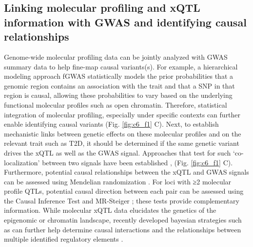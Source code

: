 \subsection{Linking molecular profiling and xQTL information with GWAS and identifying causal relationships}                
Genome-wide molecular profiling data can be jointly analyzed with GWAS summary data to help fine-map causal variants(s). For example, a hierarchical modeling approach fGWAS \cite{pickrellJointAnalysisFunctional2014} statistically models the prior probabilities that a genomic region contains an association with the trait and that  a SNP in that region is causal, allowing these probabilities to vary based on the underlying functional molecular profiles such as open chromatin. Therefore, statistical integration of molecular profiling, especially under specific contexts can further enable identifying causal variants (Fig. \ref{fig:c6_f1} C). Next, to establish mechanistic links between genetic effects on these molecular profiles and on the relevant trait such as T2D, it should be determined if the same genetic variant drives the xQTL as well as the GWAS signal. Approaches that test for such ‘co-localization’ between two signals have been established \cite{giambartolomeiBayesianTestColocalisation2014, nicaCandidateCausalRegulatory2010, hormozdiariColocalizationGWASEQTL2016}, (Fig. \ref{fig:c6_f1} C). Furthermore, potential causal relationships between the xQTL and GWAS signals can be assessed using Mendelian randomization \cite{hormozdiariColocalizationGWASEQTL2016}. For loci with ≥2 molecular profile QTLs, potential causal direction between each pair can be assessed using the Causal Inference Test \cite{millsteinDisentanglingMolecularRelationships2009} and MR-Steiger \cite{hemaniOrientingCausalRelationship2017}; these tests provide complementary information. While molecular xQTL data elucidates the genetics of the epigenomic or chromatin landscape, recently developed bayesian strategies such as \cite{kumasakaHighresolutionGeneticMapping2019} can further help determine causal interactions and the relationships between multiple identified regulatory elements .
                
                        
